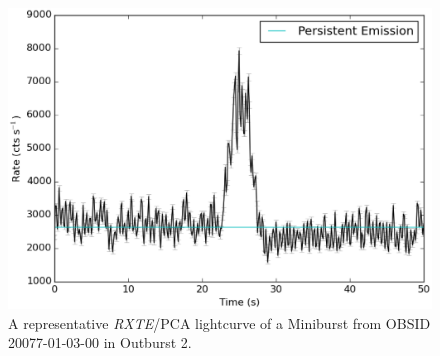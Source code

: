 \begin{figure}
  \centering
  \includegraphics[width=.9\linewidth, trim={0cm 0 0cm 0},clip]{images/mini.eps}
  \caption[A representative \textit{RXTE} lightcurve of a Miniburst.]{\small  A representative \indexpca\textit{RXTE}/PCA lightcurve of a Miniburst from OBSID 20077-01-03-00 in Outburst 2.}
  \label{fig:a_mini}
\end{figure}
